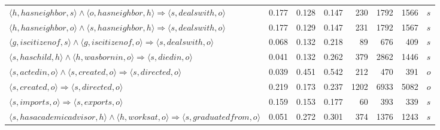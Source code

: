 \begin{tabular}{lrrrrrrl}
       $\langle h, hasneighbor, s \rangle \wedge \langle o, hasneighbor, h \rangle \Rightarrow \langle s, dealswith , o \rangle$ &          0.177 &              0.128 &              0.147 &                             230 &                        1792 &                            1566 &        $s$ \\
       $\langle h, hasneighbor, o \rangle \wedge \langle s, hasneighbor, h \rangle \Rightarrow \langle s, dealswith , o \rangle$ &          0.177 &              0.129 &              0.147 &                             231 &                        1792 &                            1567 &        $s$ \\
       $\langle g, iscitizenof, s \rangle \wedge \langle g, iscitizenof, o \rangle \Rightarrow \langle s, dealswith , o \rangle$ &          0.068 &              0.132 &              0.218 &                              89 &                         676 &                             409 &        $s$ \\
               $\langle s, haschild, h \rangle \wedge \langle h, wasbornin, o \rangle \Rightarrow \langle s, diedin , o \rangle$ &          0.041 &              0.132 &              0.262 &                             379 &                        2862 &                            1446 &        $s$ \\
                $\langle s, actedin, o \rangle \wedge \langle s, created, o \rangle \Rightarrow \langle s, directed , o \rangle$ &          0.039 &              0.451 &              0.542 &                             212 &                         470 &                             391 &        $o$ \\
                                                     $\langle s, created, o \rangle \Rightarrow \langle s, directed , o \rangle$ &          0.219 &              0.173 &              0.237 &                            1202 &                        6933 &                            5082 &        $o$ \\
                                                      $\langle s, imports, o \rangle \Rightarrow \langle s, exports , o \rangle$ &          0.159 &              0.153 &              0.177 &                              60 &                         393 &                             339 &        $s$ \\
$\langle s, hasacademicadvisor, h \rangle \wedge \langle h, worksat, o \rangle \Rightarrow \langle s, graduatedfrom , o \rangle$ &          0.051 &              0.272 &              0.301 &                             374 &                        1376 &                            1243 &        $s$ \\

\end{tabular}
